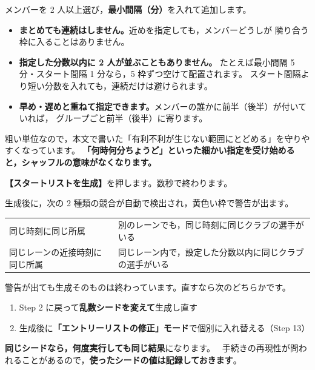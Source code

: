 \begin{J2M}
メンバーを 2 人以上選び，\textbf{最小間隔（分）}を入れて追加します。

\begin{itemize}
\item \textbf{まとめても連続はしません。}近めを指定しても，メンバーどうしが
      隣り合う枠に入ることはありません。
\item \textbf{指定した分数以内に 2 人が並ぶこともありません。}
      たとえば最小間隔 5 分・スタート間隔 1 分なら，5 枠ずつ空けて配置されます。
      スタート間隔より短い分数を入れても，連続だけは避けられます。
\item \textbf{早め・遅めと重ねて指定できます。}メンバーの誰かに前半（後半）が付いていれば，
      グループごと前半（後半）に寄ります。
\end{itemize}

粗い単位なので，本文で書いた「有利不利が生じない範囲にとどめる」を守りやすくなっています。
\textbf{「何時何分ちょうど」といった細かい指定を受け始めると，シャッフルの意味がなくなります。}
\end{J2M}

\begin{J2M}
\textbf{【スタートリストを生成】}を押します。数秒で終わります。


生成後に，次の 2 種類の競合が自動で検出され，黄色い枠で警告が出ます。

\begin{center}
\small
\begin{tabular}{@{}P{40mm}P{90mm}@{}}
\toprule
{} &  \\
\midrule
同じ時刻に同じ所属 & 別のレーンでも，同じ時刻に同じクラブの選手がいる \\
同じレーンの近接時刻に同じ所属 & 同じレーン内で，設定した分数以内に同じクラブの選手がいる \\
\bottomrule
\end{tabular}
\end{center}

警告が出ても生成そのものは終わっています。直すなら次のどちらかです。

\begin{enumerate}
\item Step 2 に戻って\textbf{乱数シードを変えて}生成し直す
\item 生成後に\textbf{「エントリーリストの修正」モード}で個別に入れ替える（Step 13）
\end{enumerate}

\textbf{同じシードなら，何度実行しても同じ結果}になります。
\tRANK\ 手続きの再現性が問われることがあるので，\textbf{使ったシードの値は記録しておきます}。
\end{J2M}

